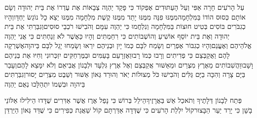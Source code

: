 \documentclass[../main/main.tex]{subfiles}
\begin{document}
\begin{multicols}{\ncols}
עַל הָרֹעִים חָרָה אַפִּי וְעַל הָעַתּוּדִים אֶפְקוֹד כִּי פָקַד יַהְוֶה צְבָאוֹת אֶת עֶדְרוֹ אֶת בֵּית יְהוּדָה וְשָׂם אוֹתָם כְּסוּס הוֹדוֹ בַּמִּלְחָמָה\PreVerseSpace{}מִמֶּנּוּ פִנָּה מִמֶּנּוּ יָתֵד מִמֶּנּוּ קֶשֶׁת מִלְחָמָה מִמֶּנּוּ יֵצֵא כָל נוֹגֵשׂ יַחְדָּו\PreVerseSpace{}וְהָיוּ כְגִבֹּרִים בּוֹסִים בְּטִיט חוּצוֹת בַּמִּלְחָמָה וְנִלְחֲמוּ כִּי יַהְוֶה עִמָּם וְהֹבִישׁוּ רֹכְבֵי סוּסִים\PreVerseSpace{}וְגִבַּרְתִּי אֶת בֵּית יְהוּדָה וְאֶת בֵּית יוֹסֵף אוֹשִׁיעַ וְהוֹשְׁבוֹתִים כִּי רִחַמְתִּים וְהָיוּ כַּאֲשֶׁר לֹא זְנַחְתִּים כִּי אֲנִי יַהְוֶה אֱלֹהֵיהֶם וְאֶעֱנֵם\PreVerseSpace{}וְהָיוּ כְגִבּוֹר אֶפְרַיִם וְשָׂמַח לִבָּם כְּמוֹ יָיִן וּבְנֵיהֶם יִרְאוּ וְשָׂמֵחוּ יָגֵל לִבָּם בַּיהוָה\PreVerseSpace{}אֶשְׁרְקָה לָהֶם וַאֲקַבְּצֵם כִּי פְדִיתִים וְרָבוּ כְּמוֹ רָבוּ\PreVerseSpace{}וְאֶזְרָעֵם בָּעַמִּים וּבַמֶּרְחַקִּים יִזְכְּרוּנִי וְחִיּוּ\SubEnd{} אֶת בְּנֵיהֶם וָשָׁבוּ\PreVerseSpace{}וַהֲשִׁבוֹתִים מֵאֶרֶץ מִצְרַיִם וּמֵאַשּׁוּר אֲקַבְּצֵם וְאֶל אֶרֶץ גִּלְעָד וּלְבָנוֹן אֲבִיאֵם וְלֹא יִמָּצֵא לָהֶם\PreVerseSpace{}וְעָבַר בַּיָּם צָרָה וְהִכָּה בַיָּם גַּלִּים וְהֹבִישׁוּ כֹּל מְצוּלוֹת יְאֹר וְהוּרַד גְּאוֹן אַשּׁוּר וְשֵׁבֶט מִצְרַיִם יָסוּר\PreVerseSpace{}וְגִבַּרְתִּים בַּיהוָה וּבִשְׁמוֹ יִתְהַלָּכוּ נְאֻם יַהְוֶה\OpenSection{}\par
{}פְּתַח לְבָנוֹן דְּלָתֶיךָ וְתֹאכַל אֵשׁ בַּאֲרָזֶיךָ\PreVerseSpace{}הֵילֵל בְּרוֹשׁ כִּי נָפַל אֶרֶז אֲשֶׁר אַדִּרִים שֻׁדָּדוּ הֵילִילוּ אַלּוֹנֵי בָשָׁן כִּי יָרַד יַעַר הַבָּצוּר\PreVerseSpace{}קוֹל יִלְלַת הָרֹעִים כִּי שֻׁדְּדָה אַדַּרְתָּם קוֹל שַׁאֲגַת כְּפִירִים כִּי שֻׁדַּד גְּאוֹן הַיַּרְדֵּן\OpenSection{}\par

\end{multicols}
\end{document}
